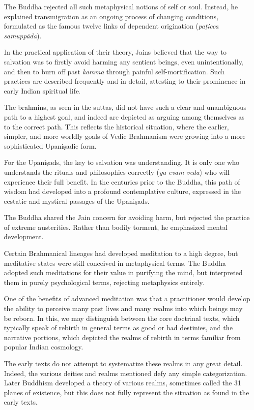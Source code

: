 \documentclass[12pt,openany]{book}%
\begin{document}
The Buddha rejected all such metaphysical notions of self or soul. Instead, he explained transmigration as an ongoing process of changing conditions, formulated as the famous twelve links of dependent origination (\textit{\textsanskrit{paṭicca} \textsanskrit{samuppāda}}).

In the practical application of their theory, Jains believed that the way to salvation was to firstly avoid harming any sentient beings, even unintentionally, and then to burn off past \textit{kamma} through painful self-mortification. Such practices are described frequently and in detail, attesting to their prominence in early Indian spiritual life.

The brahmins, as seen in the suttas, did not have such a clear and unambiguous path to a highest goal, and indeed are depicted as arguing among themselves as to the correct path. This reflects the historical situation, where the earlier, simpler, and more worldly goals of Vedic Brahmanism were growing into a more sophisticated \textsanskrit{Upaniṣadic} form.

For the \textsanskrit{Upaniṣads}, the key to salvation was understanding. It is only one who understands the rituals and philosophies correctly (\textit{ya evam veda}) who will experience their full benefit. In the centuries prior to the Buddha, this path of wisdom had developed into a profound contemplative culture, expressed in the ecstatic and mystical passages of the \textsanskrit{Upaniṣads}.

The Buddha shared the Jain concern for avoiding harm, but rejected the practice of extreme austerities. Rather than bodily torment, he emphasized mental development.

Certain Brahmanical lineages had developed meditation to a high degree, but meditative states were still conceived in metaphysical terms. The Buddha adopted such meditations for their value in purifying the mind, but interpreted them in purely psychological terms, rejecting metaphysics entirely.

One of the benefits of advanced meditation was that a practitioner would develop the ability to perceive many past lives and many realms into which beings may be reborn. In this, we may distinguish between the core doctrinal texts, which typically speak of rebirth in general terms as good or bad destinies, and the narrative portions, which depicted the realms of rebirth in terms familiar from popular Indian cosmology.

The early texts do not attempt to systematize these realms in any great detail. Indeed, the various deities and realms mentioned defy any simple categorization. Later Buddhism developed a theory of various realms, sometimes called the 31 planes of existence, but this does not fully represent the situation as found in the early texts.
\end{document}
